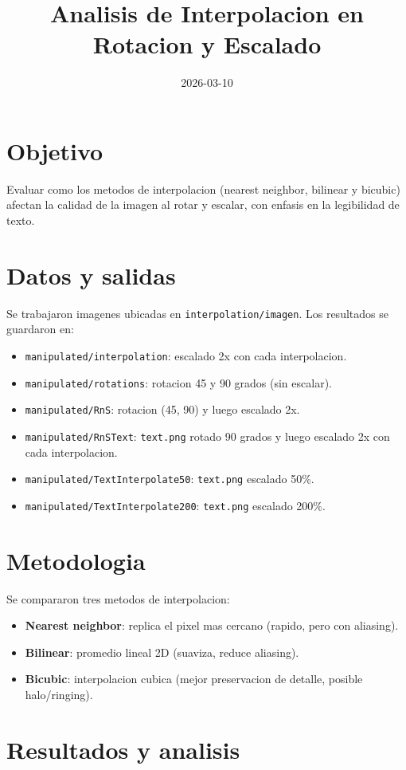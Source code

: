 \documentclass[11pt]{article}
\title{Analisis de Interpolacion en Rotacion y Escalado}
\author{}
\date{2026-03-10}
\begin{document}
\maketitle

\section*{Objetivo}
Evaluar como los metodos de interpolacion (nearest neighbor, bilinear y bicubic)
afectan la calidad de la imagen al rotar y escalar, con enfasis en la legibilidad
de texto.

\section*{Datos y salidas}
Se trabajaron imagenes ubicadas en \texttt{interpolation/imagen}. Los resultados
se guardaron en:
\begin{itemize}
  \item \texttt{manipulated/interpolation}: escalado 2x con cada interpolacion.
  \item \texttt{manipulated/rotations}: rotacion 45 y 90 grados (sin escalar).
  \item \texttt{manipulated/RnS}: rotacion (45, 90) y luego escalado 2x.
  \item \texttt{manipulated/RnSText}: \texttt{text.png} rotado 90 grados y luego
        escalado 2x con cada interpolacion.
  \item \texttt{manipulated/TextInterpolate50}: \texttt{text.png} escalado 50\%.
  \item \texttt{manipulated/TextInterpolate200}: \texttt{text.png} escalado 200\%.
\end{itemize}

\section*{Metodologia}
Se compararon tres metodos de interpolacion:
\begin{itemize}
  \item \textbf{Nearest neighbor}: replica el pixel mas cercano (rapido, pero con
        aliasing).
  \item \textbf{Bilinear}: promedio lineal 2D (suaviza, reduce aliasing).
  \item \textbf{Bicubic}: interpolacion cubica (mejor preservacion de detalle,
        posible halo/ringing).
\end{itemize}

\section*{Resultados y analisis}
\end{document}
